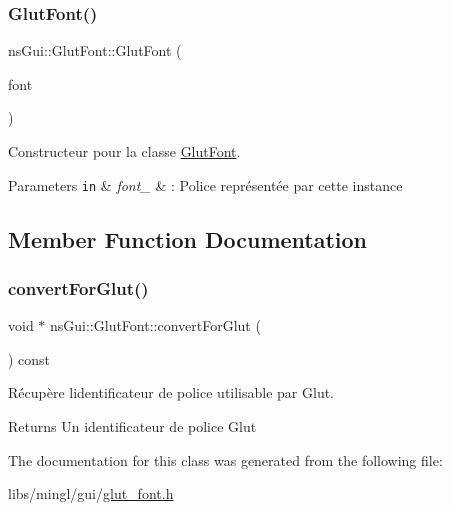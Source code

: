\subsubsection{\texorpdfstring{Glut\+Font()}{GlutFont()}}
{\footnotesize\ttfamily ns\+Gui\+::\+Glut\+Font\+::\+Glut\+Font (\begin{DoxyParamCaption}\item[{const \hyperlink{classns_gui_1_1_glut_font_aeeeb02d69e7dfc7e57957bd658c465ce}{Glut\+Fonts} \&}]{font }\end{DoxyParamCaption})}



Constructeur pour la classe \hyperlink{classns_gui_1_1_glut_font}{Glut\+Font}. 


\begin{DoxyParams}[1]{Parameters}
\mbox{\tt in}  & {\em font\+\_\+} & \+: Police représentée par cette instance \\
\hline
\end{DoxyParams}


\subsection{Member Function Documentation}
\mbox{\label{classns_gui_1_1_glut_font_a10921b4183b246e9cfdebaca6b9e91a2}} 
\subsubsection{\texorpdfstring{convert\+For\+Glut()}{convertForGlut()}}
{\footnotesize\ttfamily void $\ast$ ns\+Gui\+::\+Glut\+Font\+::convert\+For\+Glut (\begin{DoxyParamCaption}{ }\end{DoxyParamCaption}) const}



Récupère l\textquotesingle{}identificateur de police utilisable par Glut. 

\begin{DoxyReturn}{Returns}
Un identificateur de police Glut 
\end{DoxyReturn}


The documentation for this class was generated from the following file\+:\begin{DoxyCompactItemize}
\item 
libs/mingl/gui/\hyperlink{glut__font_8h}{glut\+\_\+font.\+h}\end{DoxyCompactItemize}
